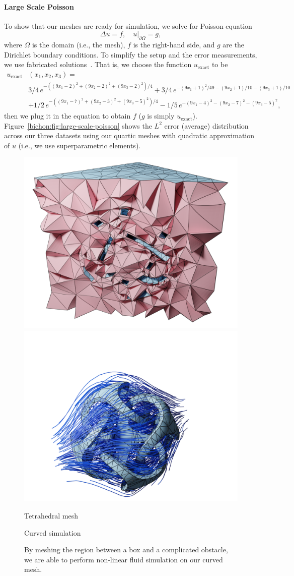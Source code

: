 \paragraph{Large Scale Poisson}
To show that our meshes are ready for simulation, we solve for Poisson equation
\[
\Delta u  = f,\quad
u|_{\partial \Omega} = g,
\]
where $\Omega$ is the domain (i.e., the mesh), $f$ is the right-hand side, and $g$ are the Dirichlet boundary conditions. To simplify the setup and the error measurements, we use fabricated solutions~\cite{SALARI:2000:CVB}. That is, we choose the function $u_\text{exact}$ to be {\scriptsize
\begin{align*}
u_\text{exact}&(x_1,x_2,x_3) =
\\&3/4\,{ e}^{-((9x_1-2)^2+(9x_2-2)^2+(9x_3-2)^2)/4}+
3/4\,{ e}^{-(9x_1+1)^2/49-(9x_2+1)/10-(9x_3+1)/10} \\
%
&+1/2\,{ e}^{-((9x_1-7)^2+(9x_2-3)^2+(9x_3-5)^2)/4}-
1/5\,{ e}^{-(9x_1-4)^2-(9x_2-7)^2-(9x_3-5)^2},
\end{align*}}
then we plug it in the equation to obtain $f$ ($g$ is simply $u_\text{exact}$). Figure~\ref{bichon:fig:large-scale-poisson} shows the $L^2$ error (average) distribution across our three datasets using our quartic meshes with quadratic approximation of $u$ (i.e., we use superparametric elements).


\begin{figure}
    \centering\small
    \includegraphics[width=.45\linewidth]{curve_meshing_in_shell_tex/figs/fluid/0003}\hfill
    \includegraphics[width=.53\linewidth]{curve_meshing_in_shell_tex/figs/fluid/0002}\hfill
    \parbox{.45\linewidth}{\centering Tetrahedral mesh}\hfill
    \parbox{.53\linewidth}{\centering Curved simulation}\hfill
    \caption{By meshing the region between a box and a complicated obstacle, we are able to perform non-linear fluid simulation on our curved mesh.}
    \label{bichon:fig:ns}
\end{figure}
